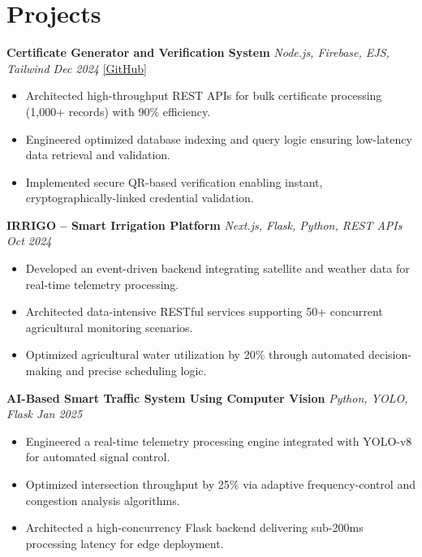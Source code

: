 \documentclass[a4paper,10pt]{article}
\begin{document}
\section*{Projects}

\textbf{Certificate Generator and Verification System} \hfill \textit{Node.js, Firebase, EJS, Tailwind \quad Dec 2024} \quad \href{https://github.com/your-github/advanced-certificate-generator}{[GitHub]}
\begin{itemize}
\item Architected high-throughput REST APIs for bulk certificate processing (1,000+ records) with 90\% efficiency.
\item Engineered optimized database indexing and query logic ensuring low-latency data retrieval and validation.
\item Implemented secure QR-based verification enabling instant, cryptographically-linked credential validation.
\end{itemize}

\vspace{2pt}

\textbf{IRRIGO -- Smart Irrigation Platform} \hfill \textit{Next.js, Flask, Python, REST APIs \quad Oct 2024}
\begin{itemize}
\item Developed an event-driven backend integrating satellite and weather data for real-time telemetry processing.
\item Architected data-intensive RESTful services supporting 50+ concurrent agricultural monitoring scenarios.
\item Optimized agricultural water utilization by 20\% through automated decision-making and precise scheduling logic.
\end{itemize}

\vspace{2pt}

\textbf{AI-Based Smart Traffic System Using Computer Vision} \hfill \textit{Python, YOLO, Flask \quad Jan 2025}
\begin{itemize}
\item Engineered a real-time telemetry processing engine integrated with YOLO-v8 for automated signal control.
\item Optimized intersection throughput by 25\% via adaptive frequency-control and congestion analysis algorithms.
\item Architected a high-concurrency Flask backend delivering sub-200ms processing latency for edge deployment.
\end{itemize}
\end{document}
